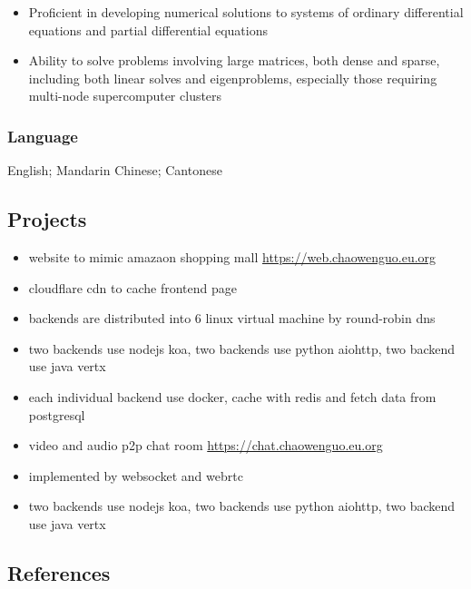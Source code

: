 \documentclass[
]{article}
\providecommand{\tightlist}{%
  \setlength{\itemsep}{0pt}\setlength{\parskip}{0pt}}
\begin{document}
\begin{itemize}
\tightlist
\item
  Proficient in developing numerical solutions to systems of ordinary
  differential equations and partial differential equations
\item
  Ability to solve problems involving large matrices, both dense and
  sparse, including both linear solves and eigenproblems, especially
  those requiring multi-node supercomputer clusters
\end{itemize}

\hypertarget{language}{%
\subsubsection{Language}\label{language}}

English; Mandarin Chinese; Cantonese

\hypertarget{projects}{%
\subsection{Projects}\label{projects}}

\begin{itemize}
\tightlist
\item
  website to mimic amazaon shopping mall
  \url{https://web.chaowenguo.eu.org}
\item
  cloudflare cdn to cache frontend page
\item
  backends are distributed into 6 linux virtual machine by round-robin
  dns
\item
  two backends use nodejs koa, two backends use python aiohttp, two
  backend use java vertx
\item
  each individual backend use docker, cache with redis and fetch data
  from postgresql
\end{itemize}

\begin{itemize}
\tightlist
\item
  video and audio p2p chat room \url{https://chat.chaowenguo.eu.org}
\item
  implemented by websocket and webrtc
\item
  two backends use nodejs koa, two backends use python aiohttp, two
  backend use java vertx
\end{itemize}

\hypertarget{references}{%
\subsection{References}\label{references}}
\end{document}
